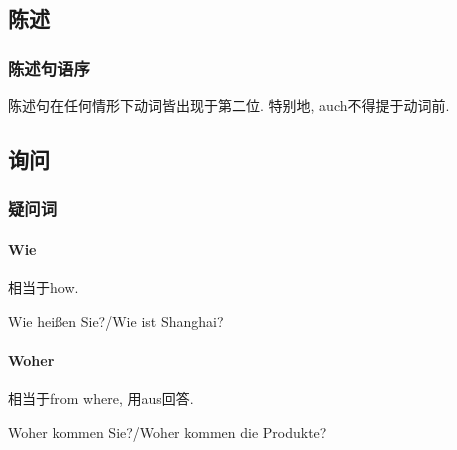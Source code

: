 \documentclass[hidelinks]{ctexart}
\begin{document}


\subsection{陈述} %
\label{sub:陈述}

\subsubsection{陈述句语序} %
\label{ssub:陈述句语序}

\begin{pitfall}
    陈述句在任何情形下动词皆出现于第二位. 特别地, auch不得提于动词前.
\end{pitfall}




\subsection{询问} %
\label{sub:询问}

\subsubsection{疑问词} %
\label{ssub:疑问词}

\paragraph{Wie} %
\label{par:wie}
相当于how.
\begin{sample}
    \begin{linguaex}
        \label{langex:wie_heissen}
        Wie hei\ss en Sie?/Wie ist Shanghai?
    \end{linguaex}
\end{sample}


\paragraph{Woher} %
\label{par:woher}
相当于from where, 用aus回答.
\begin{sample}
    \begin{linguaex}
        Woher kommen Sie?/Woher kommen die Produkte?
    \end{linguaex}
\end{sample}
\end{document}
